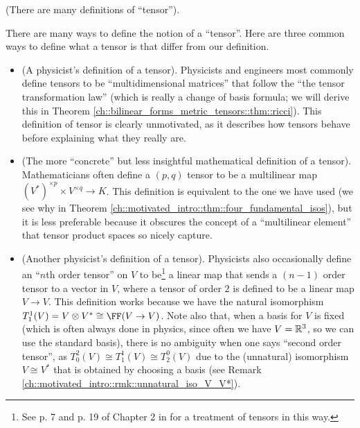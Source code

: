 \begin{remark}
\label{ch::motivated_intro::rmk::many_defs_tensor}
    (There are many definitions of ``tensor'').
    
    There are many ways to define the notion of a ``tensor''. Here are three common ways to define what a tensor is that differ from our definition.
    
    \begin{itemize}
        \item (A physicist's definition of a tensor). Physicists and engineers most commonly define tensors to be ``multidimensional matrices'' that follow the ``the tensor transformation law'' (which is really a change of basis formula; we will derive this in Theorem \ref{ch::bilinear_forms_metric_tensors::thm::ricci}). This definition of tensor is clearly unmotivated, as it describes how tensors behave before explaining what they really are.
        \item (The more ``concrete'' but less insightful mathematical definition of a tensor). Mathematicians often define a $(p, q)$ tensor to be a multilinear map $(V^*)^{\times p} \times V^{\times q} \rightarrow K$. This definition is equivalent to the one we have used (we see why in Theorem \ref{ch::motivated_intro::thm::four_fundamental_isos}), but it is less preferable because it obscures the concept of a ``multilinear element'' that tensor product spaces so nicely capture.
        \item (Another physicist's definition of a tensor). Physicists also occasionally define an ``$n$th order tensor'' on $V$ to be\footnote{See p. 7 and p. 19 of Chapter 2 in \cite{BonetWood} for a treatment of tensors in this way.} a linear map that sends a $(n - 1)$ order tensor to a vector in $V$, where a tensor of order $2$ is defined to be a linear map $V \rightarrow V$. This definition works because we have the natural isomorphism $T^1_1(V) = V \otimes V^* \cong \FF(V \rightarrow V)$. Note also that, when a basis for $V$ is fixed (which is often always done in physics, since often we have $V = \mathbb{R}^3$, so we can use the standard basis), there is no ambiguity when one says ``second order tensor'', as $T^2_0(V) \cong T^1_1(V) \cong T^0_2(V)$ due to the (unnatural) isomorphism $V \cong V^*$ that is obtained by choosing a basis (see Remark \ref{ch::motivated_intro::rmk::unnatural_iso_V_V*}).
    \end{itemize}
    
\end{remark}

